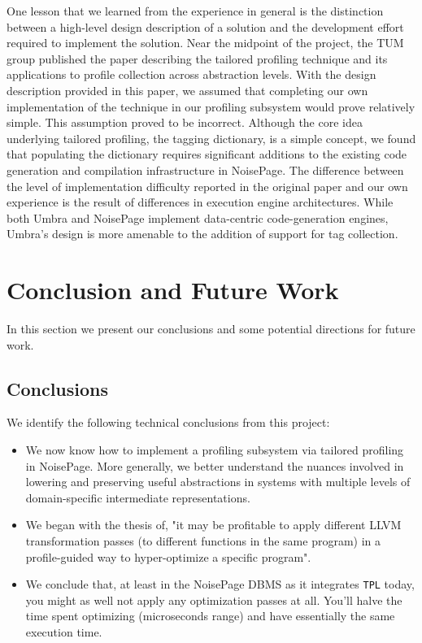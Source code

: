 \documentclass{vldb}
\newcommand{\tpl}{\texttt{TPL}\xspace}
\begin{document}
One lesson that we learned from the experience in general is the distinction between a high-level design description of a solution and the development effort required to implement the solution. Near the midpoint of the project, the TUM group published the paper describing the tailored profiling technique and its applications to profile collection across abstraction levels. With the design description provided in this paper, we assumed that completing our own implementation of the technique in our profiling subsystem would prove relatively simple. This assumption proved to be incorrect. Although the core idea underlying tailored profiling, the tagging dictionary, is a simple concept, we found that populating the dictionary requires significant additions to the existing code generation and compilation infrastructure in NoisePage. The difference between the level of implementation difficulty reported in the original paper \cite{beischl21} and our own experience is the result of differences in execution engine architectures. While both Umbra \cite{umbra} and NoisePage implement data-centric code-generation engines, Umbra’s design is more amenable to the addition of support for tag collection.


\section{Conclusion and Future Work}

In this section we present our conclusions and some potential directions for future work.

\subsection{Conclusions}

We identify the following technical conclusions from this project:
\begin{itemize}
    \item We now know how to implement a profiling subsystem via tailored profiling in NoisePage. More generally, we better understand the nuances involved in lowering and preserving useful abstractions in systems with multiple levels of domain-specific intermediate representations.
    \item We began with the thesis of, "it may be profitable to apply different LLVM transformation passes (to different functions in the same program) in a profile-guided way to hyper-optimize a specific program".
    \item We conclude that, at least in the NoisePage DBMS as it integrates \tpl today, you might as well not apply any optimization passes at all. You'll halve the time spent optimizing (microseconds range) and have essentially the same execution time.
\end{itemize}
\end{document}
